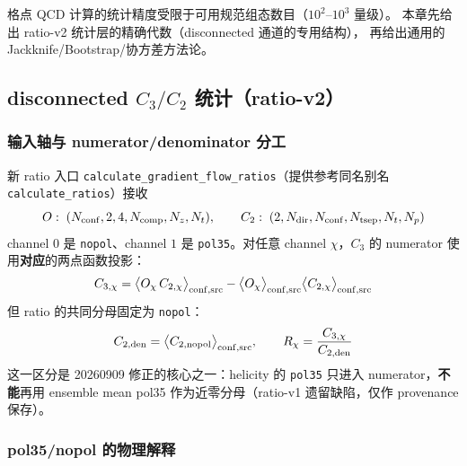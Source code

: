 \documentclass[11pt,a4paper]{ctexart}
\newcommand{\code}[1]{\texttt{#1}}
\begin{document}
格点 QCD 计算的统计精度受限于可用规范组态数目（$10^2$--$10^3$ 量级）。
本章先给出 ratio-v2 统计层的精确代数（disconnected 通道的专用结构），
再给出通用的 Jackknife/Bootstrap/协方差方法论。

\subsection{disconnected $C_3/C_2$ 统计（ratio-v2）}
\label{sec:ratio-v2}

\subsubsection{输入轴与 numerator/denominator 分工}

新 ratio 入口 \code{calculate\_gradient\_flow\_ratios}（提供参考同名别名
\code{calculate\_ratios}）接收
\begin{equation}
O:\;(N_{\rm conf},2,4,N_{\rm comp},N_z,N_t), \qquad
C_2:\;(2,N_{\rm dir},N_{\rm conf},N_{\rm tsep},N_t,N_p)
\end{equation}
channel $0$ 是 \code{nopol}、channel $1$ 是 \code{pol35}。对任意 channel
$\chi$，$C_3$ 的 numerator 使用\textbf{对应}的两点函数投影：
\begin{equation}\label{eq:c3-cov}
C_{3,\chi}
= \bigl\langle O_\chi\,C_{2,\chi}\bigr\rangle_{\rm conf,src}
-\bigl\langle O_\chi\bigr\rangle_{\rm conf,src}
\bigl\langle C_{2,\chi}\bigr\rangle_{\rm conf,src}
\end{equation}
但 ratio 的共同分母固定为 \code{nopol}：
\begin{equation}\label{eq:common-denominator}
C_{2,\rm den} = \bigl\langle C_{2,\rm nopol}\bigr\rangle_{\rm conf,src},
\qquad
R_\chi = \frac{C_{3,\chi}}{C_{2,\rm den}}
\end{equation}
这一区分是 20260909 修正的核心之一：helicity 的 \code{pol35} 只进入
numerator，\textbf{不能}再用 ensemble mean pol35 作为近零分母（ratio-v1
遗留缺陷，仅作 provenance 保存）。

\subsubsection{pol35/nopol 的物理解释}
\end{document}
